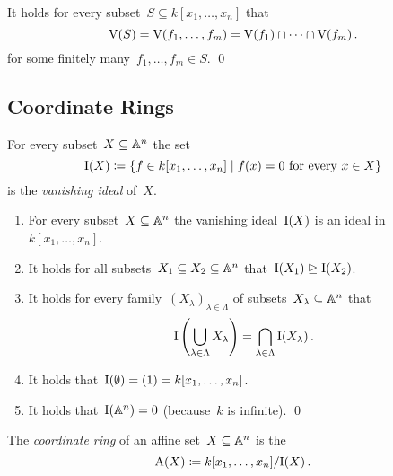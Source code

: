 \begin{corollary}
  It holds for every subset~$S \subseteq k[x_1, \dotsc, x_n]$ that
  \[
      \operatorname{V}(S)
    = \operatorname{V}(f_1, \dotsc, f_m)
    = \operatorname{V}(f_1) \cap \dotsb \cap \operatorname{V}(f_m) \,.
  \]
  for some finitely many~$f_1, \dotsc, f_m \in S$.
  \qed
\end{corollary}





\subsection{Coordinate Rings}


\begin{definition}
  For every subset~$X \subseteq \mathbb{A}^n$ the set
  \[
              \videal(X)
    \defined  \{
                f \in k[x_1, \dotsc, x_n]
              \suchthat
                \text{$f(x) = 0$ for every~$x \in X$}
              \}
  \]
  is the \emph{vanishing ideal} of~$X$.
\end{definition}


\begin{lemma}
  \label{properties of vanishing ideals}
  \leavevmode
  \begin{enumerate}
    \item
      For every subset~$X \subseteq \mathbb{A}^n$ the vanishing ideal~$\operatorname{I}(X)$ is an ideal in~$k[x_1, \dotsc, x_n]$.
    \item
      It holds for all subsets~$X_1 \subseteq X_2 \subseteq \mathbb{A}^n$ that~$\operatorname{I}(X_1) \trianglerighteq \operatorname{I}(X_2)$.
    \item
      It holds for every family~$(X_\lambda)_{\lambda \in \Lambda}$ of subsets~$X_\lambda \subseteq \mathbb{A}^n$ that
      \[
          \operatorname{I}\left( \bigcup_{\lambda \in \Lambda} X_\lambda \right)
        = \bigcap_{\lambda \in \Lambda} \operatorname{I}(X_\lambda) \,.
      \]
    \item
      It holds that~$\operatorname{I}(\emptyset) = (1) = k[x_1, \dotsc, x_n]$.
    \item
      It holds that~$\operatorname{I}(\mathbb{A}^n) = 0$ (because~$k$ is infinite).
    \qed
  \end{enumerate}
\end{lemma}


\begin{definition}
  The \emph{coordinate ring} of an affine set~$X \subseteq \mathbb{A}^n$ is the~
  \[
              \operatorname{A}(X)
    \coloneqq  k[x_1, \dotsc, x_n] / {\operatorname{I}(X)} \,.
  \]
\end{definition}


